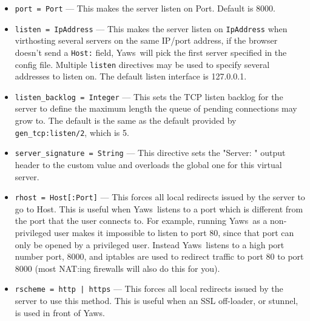 \documentclass[11pt,oneside,english]{book}
\newcommand{\Yaws}            %
        {{\sc Yaws}}
\begin{document}
\begin{itemize}

\item       \verb+port = Port+ ---
              This makes the server listen on Port. Default is 8000.

\item        \verb+listen = IpAddress+ ---
              This makes the server listen on \verb+IpAddress+ when
              virthosting several servers on the same IP/port address, if
              the browser doesn't send a \verb+Host:+ field, \Yaws\ will
              pick the first server specified in the config file. Multiple
              \verb+listen+ directives may be used to specify several
              addresses to listen on. The default listen interface is
              127.0.0.1.

\item        \verb+listen_backlog = Integer+ ---
              This sets the TCP listen backlog for the server to
              define the maximum length the queue of pending
              connections may grow to. The default is the same as
              the default provided by \verb+gen_tcp:listen/2+, which
              is 5.

\item        \verb+server_signature = String+ ---
              This directive sets the "Server: " output header to the custom
              value and overloads the global one for this virtual server.

\item       \verb+rhost = Host[:Port]+ ---
             This forces all local redirects issued by the server to go to Host.
             This is useful when \Yaws\ listens to a port which is different
             from the port that the user connects to. For example, running
             \Yaws\ as a non-privileged user makes it impossible to listen to
             port 80, since that port can only be opened by a privileged
             user. Instead \Yaws\ listens to a high port number port, 8000, and
             iptables are used to redirect traffic to port 80 to port 8000 (most
             NAT:ing firewalls will also do this for you).

\item       \verb+rscheme = http | https+ ---
              This forces  all  local  redirects  issued  by  the
              server  to  use this method. This is useful when an
              SSL off-loader, or stunnel, is  used  in  front  of
              \Yaws{}.


\end{itemize}
\end{document}
